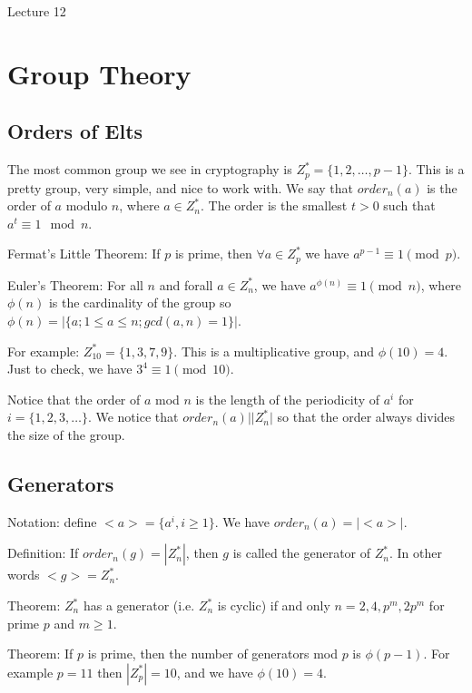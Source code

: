 \documentclass[psamsfonts]{amsart}
\begin{document}
\newpage
\Large{Lecture 12}


\maketitle

\section{Group Theory}

\subsection{Orders of Elts}

The most common group we see in cryptography is $Z_{p}^* = \{1,2, \ldots, p-1 \}$. This is a pretty group, very simple, and nice to work with. We say that $order_{n}(a)$ is the order of $a$ modulo $n$, where $a \in Z_{n}^*$. The order is the smallest $t > 0$ such that $a^t \equiv 1 \mod n$.

Fermat's Little Theorem: If $p$ is prime, then $\forall a \in Z_{p}^*$ we have $a^{p-1} \equiv 1 \pmod{p}$.

Euler's Theorem: For all $n$ and forall $a \in Z_{n}^*$, we have $a^{\phi(n)} \equiv 1 \pmod{n}$, where $\phi(n)$ is the cardinality of the group so $\phi(n) = |\{a; 1 \leq a \leq n; gcd(a,n) = 1 \} |$. 

For example: $Z_{10}^* = \{1, 3, 7, 9\}$. This is a multiplicative group, and $\phi(10) = 4$. Just to check, we have $3^{4} \equiv 1 \pmod{10}$.

Notice that the order of $a$ mod $n$ is the length of the periodicity of $a^{i}$ for $i = \{1,2,3,\ldots\}$. We notice that $order_{n}(a) | |Z_{n}^*|$ so that the order always divides the size of the group.

\subsection{Generators}

Notation: define $<a> = \{a^i, i \geq 1 \}$. We have $order_{n}(a) = |<a>|$.

Definition: If $order_{n}(g) = |Z_{n}^*|$, then $g$ is called the generator of $Z_{n}^*$. In other words $<g> = Z_{n}^*$.

Theorem: $Z_{n}^*$ has a generator (i.e. $Z_{n}^*$ is cyclic) if and only $n = 2,4, p^m, 2p^m$ for prime $p$ and $m \geq 1$.

Theorem: If $p$ is prime, then the number of generators mod $p$ is $\phi(p-1)$. For example $p = 11$ then $|Z_{p}^*| = 10$, and we have $\phi(10) = 4$.
\end{document}
